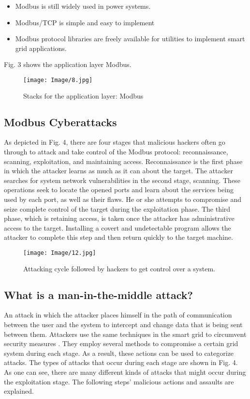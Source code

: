 \documentclass[letterpaper,10pt,conference]{IEEEtran}
\begin{document}
\begin{itemize}
    \item Modbus is still widely used in power systems.
    \item Modbus/TCP is simple and easy to implement
    \item Modbus protocol libraries are freely available for utilities to implement smart grid applications. 
\end{itemize}

Fig. 3 shows the application layer Modbus.

\begin{figure}[h!]
\centering
\texttt{[image: Image/8.jpg]}
\caption{Stacks for the application layer: Modbus \cite{R25}}
\label{Fig. 2}
\end{figure}


\subsection{Modbus Cyberattacks}
As depicted in Fig. 4, there are four stages that malicious hackers often go through to attack and take control of the Modbus protocol: reconnaissance, scanning, exploitation, and maintaining access. Reconnaissance is the first phase in which the attacker learns as much as it can about the target. The attacker searches for system network vulnerabilities in the second stage, scanning. These operations seek to locate the opened ports and learn about the services being used by each port, as well as their flaws. He or she attempts to compromise and seize complete control of the target during the exploitation phase. The third phase, which is retaining access, is taken once the attacker has administrative access to the target.
Installing a covert and undetectable program allows the attacker to complete this step and then return quickly to the target machine.
\begin{figure}[h!]
\centering
\texttt{[image: Image/12.jpg]}
\caption{Attacking cycle followed by hackers to get control over a system.}
\label{Fig. 3}
\end{figure}

\subsection{What is a man-in-the-middle attack?}
An attack in which the attacker places himself in the path of communication between the user and the system to intercept and change data that is being sent between them.
Attackers use the same techniques in the smart grid to circumvent security measures \cite{R18}. They employ several methods to compromise a certain grid system during each stage. As a result, these actions can be used to categorize attacks.
The types of attacks that occur during each stage are shown in Fig. 4. As one can see, there are many different kinds of attacks that might occur during the exploitation stage. The following steps' malicious actions and assaults are explained.
\end{document}
